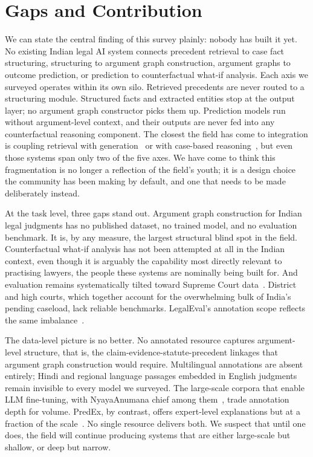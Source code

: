 \section{Gaps and Contribution}

We can state the central finding of this survey plainly: nobody has built it yet. No existing Indian legal AI system connects precedent retrieval to case fact structuring, structuring to argument graph construction, argument graphs to outcome prediction, or prediction to counterfactual what-if analysis. Each axis we surveyed operates within its own silo. Retrieved precedents are never routed to a structuring module. Structured facts and extracted entities stop at the output layer; no argument graph constructor picks them up. Prediction models run without argument-level context, and their outputs are never fed into any counterfactual reasoning component. The closest the field has come to integration is coupling retrieval with generation~\cite{nigam-etal-2025-nyayarag} or with case-based reasoning~\cite{wiratunga-etal-2024-cbrrag}, but even those systems span only two of the five axes. We have come to think this fragmentation is no longer a reflection of the field's youth; it is a design choice the community has been making by default, and one that needs to be made deliberately instead.

At the task level, three gaps stand out. Argument graph construction for Indian legal judgments has no published dataset, no trained model, and no evaluation benchmark. It is, by any measure, the largest structural blind spot in the field. Counterfactual what-if analysis has not been attempted at all in the Indian context, even though it is arguably the capability most directly relevant to practising lawyers, the people these systems are nominally being built for. And evaluation remains systematically tilted toward Supreme Court data~\cite{malik-etal-2021-ildc, nigam-etal-2024-predex}. District and high courts, which together account for the overwhelming bulk of India's pending caseload, lack reliable benchmarks. LegalEval's annotation scope reflects the same imbalance~\cite{modi-etal-2023-semeval}.

The data-level picture is no better. No annotated resource captures argument-level structure, that is, the claim-evidence-statute-precedent linkages that argument graph construction would require. Multilingual annotations are absent entirely; Hindi and regional language passages embedded in English judgments remain invisible to every model we surveyed. The large-scale corpora that enable LLM fine-tuning, with NyayaAnumana chief among them~\cite{nigam-etal-2025-nyayaanumana}, trade annotation depth for volume. PredEx, by contrast, offers expert-level explanations but at a fraction of the scale~\cite{nigam-etal-2024-predex}. No single resource delivers both. We suspect that until one does, the field will continue producing systems that are either large-scale but shallow, or deep but narrow.


